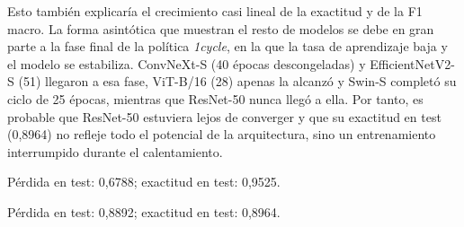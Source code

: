 Esto también explicaría el crecimiento casi lineal de la exactitud y de la F1 macro. La forma asintótica que muestran el resto de modelos se debe en gran parte a la fase final de la política \textit{1cycle}, en la que la tasa de aprendizaje baja y el modelo se estabiliza. ConvNeXt-S (40 épocas descongeladas) y EfficientNetV2-S (51) llegaron a esa fase, ViT-B/16 (28) apenas la alcanzó y Swin-S completó su ciclo de 25 épocas, mientras que ResNet-50 nunca llegó a ella. Por tanto, es probable que ResNet-50 estuviera lejos de converger y que su exactitud en test (0,8964) no refleje todo el potencial de la arquitectura, sino un entrenamiento interrumpido durante el calentamiento.

Pérdida en test: 0,6788; exactitud en test: 0,9525.



Pérdida en test: 0,8892; exactitud en test: 0,8964.



